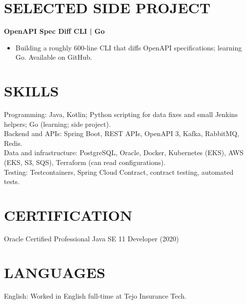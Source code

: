 \documentclass[11pt,a4paper]{article}
\begin{document}
\section*{SELECTED SIDE PROJECT}
\textbf{OpenAPI Spec Diff CLI | Go}
\begin{itemize}
\item Building a roughly 600-line CLI that diffs OpenAPI specifications; learning Go. Available on GitHub.
\end{itemize}

\section*{SKILLS}
Programming: Java, Kotlin; Python scripting for data fixes and small Jenkins helpers; Go (learning; side project).\\
Backend and APIs: Spring Boot, REST APIs, OpenAPI 3, Kafka, RabbitMQ, Redis.\\
Data and infrastructure: PostgreSQL, Oracle, Docker, Kubernetes (EKS), AWS (EKS, S3, SQS), Terraform (can read configurations).\\
Testing: Testcontainers, Spring Cloud Contract, contract testing, automated tests.

\section*{CERTIFICATION}
Oracle Certified Professional Java SE 11 Developer (2020)

\section*{LANGUAGES}
English: Worked in English full-time at Tejo Insurance Tech.
\end{document}
